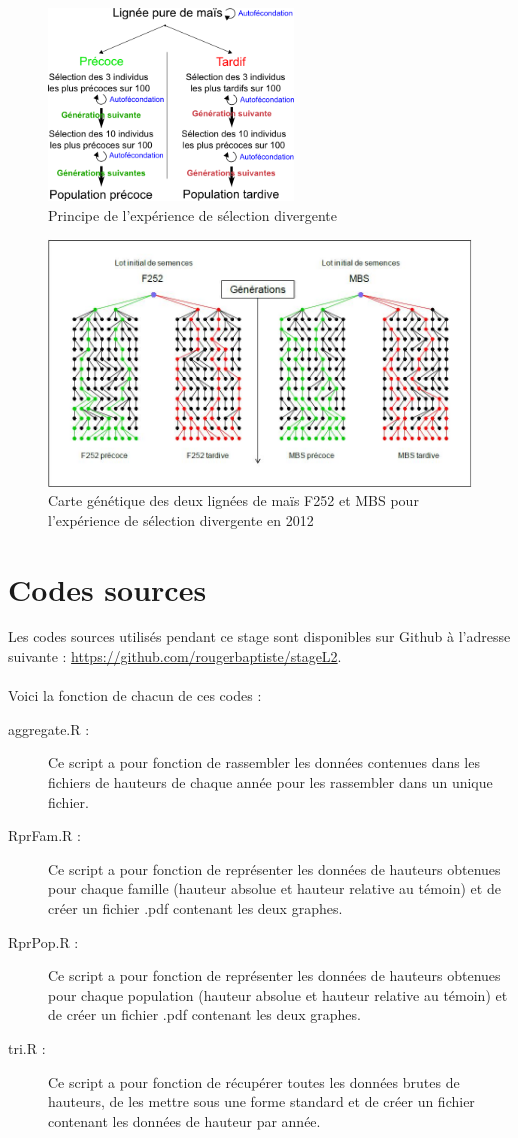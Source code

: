 \documentclass[12pt,a4paper]{report}
\begin{document}
			\begin{figure}
				\centering
				\includegraphics[width=6.5cm]{selec_div.png}
				\caption{Principe de l'expérience de sélection divergente}
				\label{selec.div}
			\end{figure}
			\begin{figure}
				\centering
				\includegraphics[width = 6.5 cm]{carte_gen.jpg}
				\caption{Carte génétique des deux lignées de maïs F252 et MBS pour l'expérience de sélection divergente en 2012}
				\label{carte_gen}
			\end{figure}
			
	
	
	
	\appendix
	
	\chapter{Codes sources}
	Les codes sources utilisés pendant ce stage sont disponibles sur Github à l'adresse suivante : \url{https://github.com/rougerbaptiste/stageL2}.\\~\\
	Voici la fonction de chacun de ces codes :
	\begin{description}
		\item [aggregate.R :] Ce script a pour fonction de rassembler les données contenues dans les fichiers de hauteurs de chaque année pour les rassembler dans un unique fichier.
		\item [RprFam.R :] Ce script a pour fonction de représenter les données de hauteurs obtenues pour chaque famille (hauteur absolue et hauteur relative au témoin) et de créer un fichier .pdf contenant les deux graphes.
		\item [RprPop.R :] Ce script a pour fonction de représenter les données de hauteurs obtenues pour chaque population (hauteur absolue et hauteur relative au témoin) et de créer un fichier .pdf contenant les deux graphes.
		\item [tri.R :] Ce script a pour fonction de récupérer toutes les données brutes de hauteurs, de les mettre sous une forme standard et de créer un fichier contenant les données de hauteur par année.
		
	\end{description}
\end{document}

